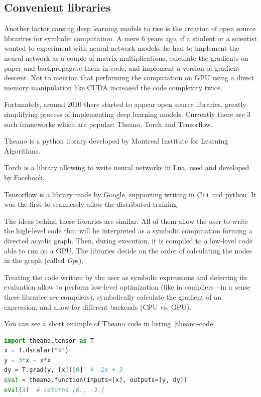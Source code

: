 \subsection{Convenient libraries}
Another factor causing deep learning models to rise is the creation of open source librarires for symbolic computation. A mere $6$ years ago, if a student or a scientist wanted to experiment with neural network models, he had to implement the neural network as a couple of matrix multiplications, calculate the gradients on paper and backpropagate them in code, and implement a version of gradient descent. Not to mention that performing the computation on GPU using a direct memory manipulation like CUDA increased the code complexity twice.

Fortunately, around $2010$ there started to appear open source libraries, greatly simplifying process of implementing deep learning models. Currently there are $3$ such frameworks which are popular: Theano, Torch and Tensorflow.

Theano \cite{theano} is a python library developed by Montreal Institute for Learning Algorithms.

Torch \cite{torch} is a library allowing to write neural networks in Lua, used and developed by Facebook.

Tensorflow \cite{tensorflow} is a library made by Google, supporting writing in C\texttt{++} and python. It was the first to seamlessly allow the distributed training.

The ideas behind these libraries are similar. All of them allow the user to write the high-level code that will be interpreted as a symbolic computation forming a directed acyclic graph. Then, during execution, it is compiled to a low-level code able to run on a GPU. The libraries decide on the order of calculating the nodes in the graph (called \emph{Op}s).

Treating the code written by the user as symbolic expressions and deferring its evaluation allow to perform low-level optimization (like in compilers---in a sense these libraries \textit{are} compilers), symbolically calculate the gradient of an expression, and allow for different backends (CPU vs. GPU).

You can see a short example of Theano code in listing~\ref{theano-code}.

\begin{lstlisting}[language=Python, caption=Example Theano code.,label={theano-code}
]
import theano.tensor as T
x = T.dscalar("x")
y = 3*x - x*x
dy = T.grad(y, [x])[0]  # -2x + 3
eval = theano.function(inputs=[x], outputs=[y, dy])
eval(3)  # returns [0., -3.]
\end{lstlisting}

